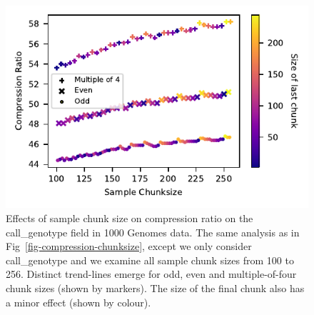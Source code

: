 \documentclass[a4paper,num-refs]{oup-contemporary}
\begin{document}
\begin{figure}[h]
\includegraphics{figures/compression-chunksize-finegrained.pdf}
\caption{Effects of sample chunk size on compression ratio on the call\_genotype
field in 1000 Genomes data.
The same analysis as in Fig~\ref{fig-compression-chunksize}, except we only
consider call\_genotype and we examine all sample chunk sizes from 
100 to 256. Distinct trend-lines emerge for odd, even and multiple-of-four
chunk sizes (shown by markers). The size of the final chunk also has a minor
effect (shown by colour).
\label{fig-compression-chunksize-finegrained}}
\end{figure}
\end{document}
